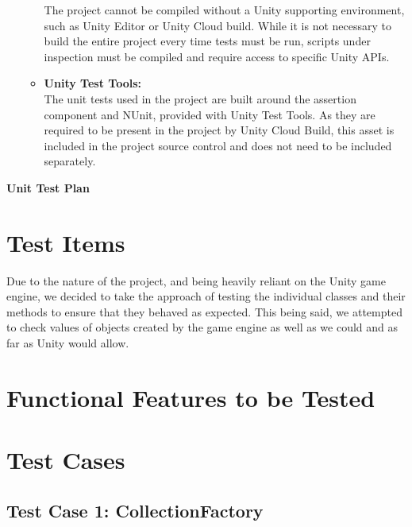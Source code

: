 \documentclass[a4paper,12pt]{article}
\begin{document}
\begin{enumerate}
\begin{itemize}
				The project cannot be compiled without a Unity supporting environment, such as Unity Editor or Unity Cloud build. While it is not necessary to build the entire project every time tests must be run, scripts under inspection must be compiled and require access to specific Unity APIs.
				\item \textbf{Unity Test Tools:}\\
				The unit tests used in the project are built around the assertion component and NUnit, provided with Unity Test Tools. As they are required to be present in the project by Unity Cloud Build, this asset is included in the project source control and does not need to be included separately.
			\end{itemize}
	\end{enumerate}
 \newpage

\begin{center}
	\huge \bfseries Unit Test Plan \\[2cm]
\end{center}

\section{Test Items}
Due to the nature of the project, and being heavily reliant on the Unity game engine, we decided to take the approach of testing the individual classes and their methods to ensure that they behaved as expected. This being said, we attempted to check values of objects created by the game engine as well as we could and as far as Unity would allow.

\section{Functional Features to be Tested}

\section{Test Cases}
	\subsection{Test Case 1: CollectionFactory}
\end{document}
